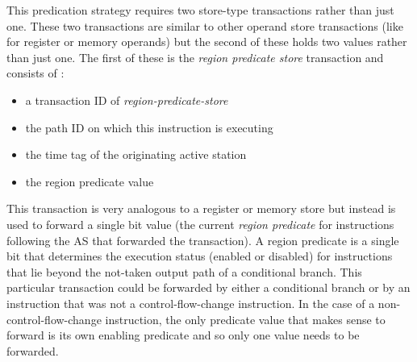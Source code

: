 \documentclass[10pt,dvips]{article}
\begin{document}
This predication strategy requires two store-type transactions
rather than just one.  These two transactions are similar
to other operand store transactions (like for register or memory
operands)
but the second of these holds two values rather than just one.
The first of these is the \textit{region predicate store}
transaction and consists of :
%
\vspace{-0.05in}
\begin{itemize}
\vspace{-0.1in}
\item{a transaction ID of \textit{region-predicate-store}}
\vspace{-0.1in}
\item{the path ID on which this instruction is executing}
\vspace{-0.1in}
\item{the time tag of the originating active station}
\vspace{-0.1in}
\item{the region predicate value}
\vspace{-0.1in}
\end{itemize}   
%
This transaction is very analogous to a register or memory
store but instead is used to forward a single bit value (the
current \textit{region predicate} for instructions following the
AS that forwarded the transaction).  
A region predicate is a single bit that determines the execution status
(enabled or disabled) for instructions that lie beyond the
not-taken output path of a conditional branch.
This particular transaction could be forwarded by either
a conditional branch or by an instruction that was not
a control-flow-change instruction.  In the
case of a non-control-flow-change instruction, the only
predicate value that makes sense to forward is its
own enabling predicate and so only one value needs
to be forwarded.
\end{document}
